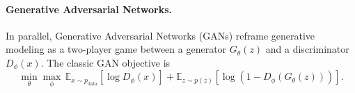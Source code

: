 \paragraph{Generative Adversarial Networks.}
In parallel, Generative Adversarial Networks (GANs) \citep{NIPS2014_f033ed80} reframe generative modeling as a two-player game between a generator $G_\theta(z)$ and a discriminator $D_\phi(x)$. The classic GAN objective is
\begin{equation}
\min_\theta \max_\phi \, \mathbb{E}_{x \sim p_{\text{data}}} [\log D_\phi(x)] + \mathbb{E}_{z \sim p(z)} [\log (1 - D_\phi(G_\theta(z)))].
\end{equation}
